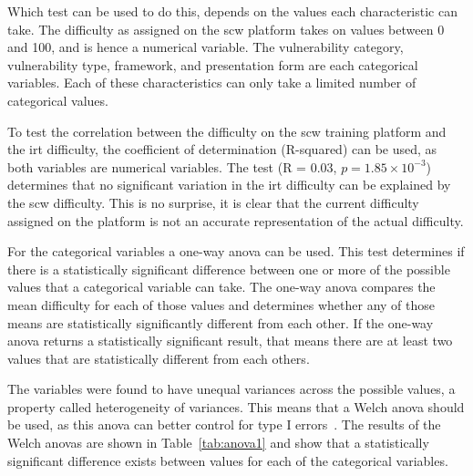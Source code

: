 Which test can be used to do this, depends on the values each characteristic can take.
The difficulty as assigned on the \gls{scw} platform takes on values between 0 and 100, and is hence a numerical variable.
The vulnerability category, vulnerability type, framework, and presentation form are each categorical variables.
Each of these characteristics can only take a limited number of categorical values.

To test the correlation between the difficulty on the \gls{scw} training platform and the \gls{irt} difficulty, the coefficient of determination (R-squared) can be used, as both variables are numerical variables.
The test (R = 0.03, $p = 1.85 \times 10^{-3}$) determines that no significant variation in the \gls{irt} difficulty can be explained by the \gls{scw} difficulty.
This is no surprise, it is clear that the current difficulty assigned on the platform is not an accurate representation of the actual difficulty.

For the categorical variables a one-way \gls{anova} can be used.
This test determines if there is a statistically significant difference between one or more of the possible values that a categorical variable can take.
The one-way \gls{anova} compares the mean difficulty for each of those values and determines whether any of those means are statistically significantly different from each other.
If the one-way \gls{anova} returns a statistically significant result, that means there are at least two values that are statistically different from each others.

The variables were found to have unequal variances across the possible values, a property called heterogeneity of variances.
This means that a Welch \gls{anova} should be used, as this \gls{anova} can better control for type I errors~\cite{liu2015comparing}.
The results of the Welch \glspl{anova} are shown in Table~\ref{tab:anova1} and show that a statistically significant difference exists between values for each of the categorical variables.

